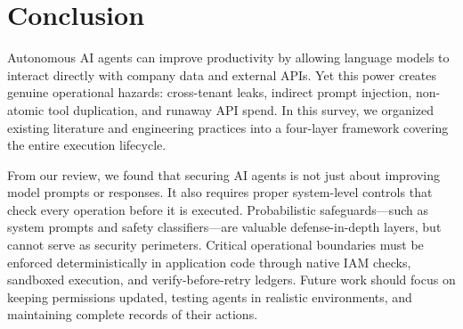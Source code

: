\documentclass[sigconf]{acmart}
\begin{document}
\section{Conclusion}
\label{sec:conclusion}
Autonomous AI agents can improve productivity by allowing language models to interact directly with company data and external APIs. Yet this power creates genuine operational hazards: cross-tenant leaks, indirect prompt injection, non-atomic tool duplication, and runaway API spend. In this survey, we organized existing literature and engineering practices into a four-layer framework covering the entire execution lifecycle.

From our review, we found that securing AI agents is not just about improving model prompts or responses. It also requires proper system-level controls that check every operation before it is executed. Probabilistic safeguards—such as system prompts and safety classifiers—are valuable defense-in-depth layers, but cannot serve as security perimeters. Critical operational boundaries must be enforced deterministically in application code through native IAM checks, sandboxed execution, and verify-before-retry ledgers. Future work should focus on keeping permissions updated, testing agents in realistic environments, and maintaining complete records of their actions.


\end{document}
